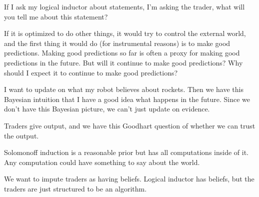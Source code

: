 \documentclass[11pt]{article}
\begin{document}
If I ask my logical inductor about statements, I'm asking the trader, what will you tell me about this statement?

If it is optimized to do other things, it would try to control the external world, and the first thing it would do (for instrumental reasons) is to make good predictions.
Making good predictions so far is often a proxy for making good predictions in the future. %
But will it continue to make good predictions? 
Why should I expect it to continue to make good predictions?


I want to update on what my robot believes about rockets. %
Then we have this Bayesian intuition that I have a good idea what happens in the future. Since we don't have this Bayesian picture, we can't just update on evidence. 

Traders give output, and we have this Goodhart question of whether we can trust the output.


Solomonoff induction is a reasonable prior but has all computations inside of it. Any computation could have something to say about the world.


We want to impute traders as having beliefs. Logical inductor has beliefs, but the traders are just structured to be an algorithm.




\end{document}
